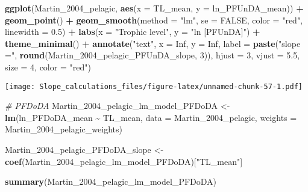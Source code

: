 \documentclass[
]{article}
\newenvironment{Shaded}{\begin{snugshade}}{\end{snugshade}}
\newcommand{\AttributeTok}[1]{\textcolor[rgb]{0.13,0.29,0.53}{#1}}
\newcommand{\CommentTok}[1]{\textcolor[rgb]{0.56,0.35,0.01}{\textit{#1}}}
\newcommand{\ConstantTok}[1]{\textcolor[rgb]{0.56,0.35,0.01}{#1}}
\newcommand{\DecValTok}[1]{\textcolor[rgb]{0.00,0.00,0.81}{#1}}
\newcommand{\FloatTok}[1]{\textcolor[rgb]{0.00,0.00,0.81}{#1}}
\newcommand{\FunctionTok}[1]{\textcolor[rgb]{0.13,0.29,0.53}{\textbf{#1}}}
\newcommand{\NormalTok}[1]{#1}
\newcommand{\OtherTok}[1]{\textcolor[rgb]{0.56,0.35,0.01}{#1}}
\newcommand{\SpecialCharTok}[1]{\textcolor[rgb]{0.81,0.36,0.00}{\textbf{#1}}}
\newcommand{\StringTok}[1]{\textcolor[rgb]{0.31,0.60,0.02}{#1}}
\begin{document}
\begin{Shaded}
\begin{Highlighting}[]
\FunctionTok{ggplot}\NormalTok{(Martin\_2004\_pelagic, }\FunctionTok{aes}\NormalTok{(}\AttributeTok{x =}\NormalTok{ TL\_mean, }\AttributeTok{y =}\NormalTok{ ln\_PFUnDA\_mean)) }\SpecialCharTok{+}
  \FunctionTok{geom\_point}\NormalTok{() }\SpecialCharTok{+}
  \FunctionTok{geom\_smooth}\NormalTok{(}\AttributeTok{method =} \StringTok{"lm"}\NormalTok{, }\AttributeTok{se =} \ConstantTok{FALSE}\NormalTok{, }\AttributeTok{color =} \StringTok{"red"}\NormalTok{, }\AttributeTok{linewidth =} \FloatTok{0.5}\NormalTok{) }\SpecialCharTok{+}
  \FunctionTok{labs}\NormalTok{(}\AttributeTok{x =} \StringTok{"Trophic level"}\NormalTok{,}
       \AttributeTok{y =} \StringTok{"ln [PFUnDA]"}\NormalTok{) }\SpecialCharTok{+}
  \FunctionTok{theme\_minimal}\NormalTok{() }\SpecialCharTok{+}
  \FunctionTok{annotate}\NormalTok{(}\StringTok{"text"}\NormalTok{, }\AttributeTok{x =} \ConstantTok{Inf}\NormalTok{, }\AttributeTok{y =} \ConstantTok{Inf}\NormalTok{, }\AttributeTok{label =} \FunctionTok{paste}\NormalTok{(}\StringTok{"slope ="}\NormalTok{, }\FunctionTok{round}\NormalTok{(Martin\_2004\_pelagic\_PFUnDA\_slope, }\DecValTok{3}\NormalTok{)), }
           \AttributeTok{hjust =} \DecValTok{3}\NormalTok{, }\AttributeTok{vjust =} \FloatTok{5.5}\NormalTok{, }\AttributeTok{size =} \DecValTok{4}\NormalTok{, }\AttributeTok{color =} \StringTok{"red"}\NormalTok{)}
\end{Highlighting}
\end{Shaded}

\texttt{[image: Slope\_calculations\_files/figure-latex/unnamed-chunk-57-1.pdf]}

\begin{Shaded}
\begin{Highlighting}[]
\CommentTok{\# PFDoDA}
\NormalTok{Martin\_2004\_pelagic\_lm\_model\_PFDoDA }\OtherTok{\textless{}{-}} \FunctionTok{lm}\NormalTok{(ln\_PFDoDA\_mean }\SpecialCharTok{\textasciitilde{}}\NormalTok{ TL\_mean, }
                                        \AttributeTok{data =}\NormalTok{ Martin\_2004\_pelagic,}
                                        \AttributeTok{weights =}\NormalTok{ Martin\_2004\_pelagic\_weights)}

\NormalTok{Martin\_2004\_pelagic\_PFDoDA\_slope }\OtherTok{\textless{}{-}} \FunctionTok{coef}\NormalTok{(Martin\_2004\_pelagic\_lm\_model\_PFDoDA)[}\StringTok{"TL\_mean"}\NormalTok{]}

\FunctionTok{summary}\NormalTok{(Martin\_2004\_pelagic\_lm\_model\_PFDoDA)}
\end{Highlighting}
\end{Shaded}
\end{document}
